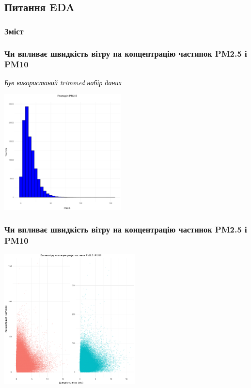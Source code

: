 \documentclass{beamer}
\begin{document}
\begin{frame}
  \section{Питання EDA}

  \frametitle{Зміст}
  \tableofcontents[currentsection]
\end{frame}


\begin{frame}
  \frametitle{Чи впливає швидкість вітру на концентрацію частинок PM2.5 і PM10}

  \quad \textit{Був використаний trimmed набір даних}

  \begin{center}
    \includegraphics[height=2.5in]{plots/question1/pm2_5_gist.png}
  \end{center}
\end{frame}

\begin{frame}
  \frametitle{Чи впливає швидкість вітру на концентрацію частинок PM2.5 і PM10}

  \begin{center}
    \includegraphics[height=2.8in]{plots/question1/wind_speed_vs_pm.png}
  \end{center}
\end{frame}
\end{document}
